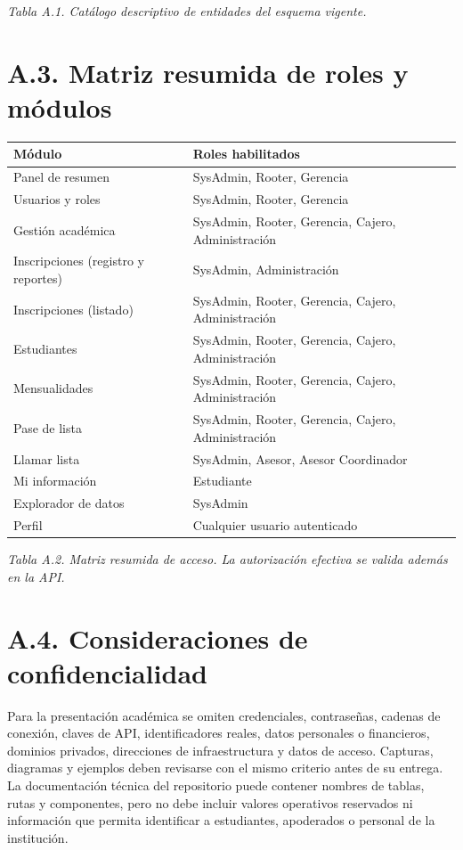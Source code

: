 \documentclass[12pt,a4paper,oneside]{report}
\begin{document}
\emph{Tabla A.1. Catálogo descriptivo de entidades del esquema vigente.}

\section*{A.3. Matriz resumida de roles y módulos}

\renewcommand{\arraystretch}{1.2}
\begin{longtable}{@{}p{}p{}@{}}
  \toprule
  \textbf{Módulo} & \textbf{Roles habilitados} \\
  \midrule
  \endhead
  Panel de resumen & SysAdmin, Rooter, Gerencia \\
  Usuarios y roles & SysAdmin, Rooter, Gerencia \\
  Gestión académica & SysAdmin, Rooter, Gerencia, Cajero, Administración \\
  Inscripciones (registro y reportes) & SysAdmin, Administración \\
  Inscripciones (listado) & SysAdmin, Rooter, Gerencia, Cajero, Administración \\
  Estudiantes & SysAdmin, Rooter, Gerencia, Cajero, Administración \\
  Mensualidades & SysAdmin, Rooter, Gerencia, Cajero, Administración \\
  Pase de lista & SysAdmin, Rooter, Gerencia, Cajero, Administración \\
  Llamar lista & SysAdmin, Asesor, Asesor Coordinador \\
  Mi información & Estudiante \\
  Explorador de datos & SysAdmin \\
  Perfil & Cualquier usuario autenticado \\
  \bottomrule
\end{longtable}

\emph{Tabla A.2. Matriz resumida de acceso. La autorización efectiva se valida además en la API.}

\section*{A.4. Consideraciones de confidencialidad}

Para la presentación académica se omiten credenciales, contraseñas, cadenas de conexión, claves de API, identificadores reales, datos personales o financieros, dominios privados, direcciones de infraestructura y datos de acceso. Capturas, diagramas y ejemplos deben revisarse con el mismo criterio antes de su entrega. La documentación técnica del repositorio puede contener nombres de tablas, rutas y componentes, pero no debe incluir valores operativos reservados ni información que permita identificar a estudiantes, apoderados o personal de la institución.
\end{document}
